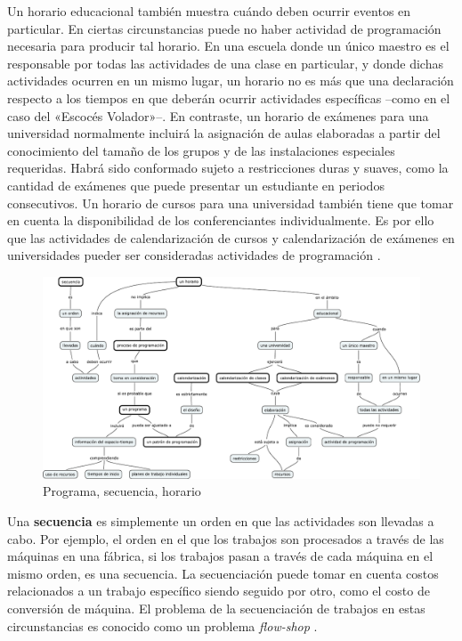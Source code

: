 \documentclass[draft,12pt,headsepline,footsepline,paper=letter]{scrreprt}
\begin{document}
Un horario educacional también muestra cuándo deben ocurrir eventos en particular. En ciertas circunstancias puede no haber actividad de programación necesaria para producir tal horario. En una escuela donde un único maestro es el responsable por todas las actividades de una clase en particular, y donde dichas actividades ocurren en un mismo lugar, un horario no es más que una declaración respecto a los tiempos en que deberán ocurrir actividades específicas –como en el caso del «Escocés Volador»–.
%
En contraste, un horario de exámenes para una universidad normalmente incluirá la asignación de aulas elaboradas a partir del conocimiento del tamaño de los grupos y de las instalaciones especiales requeridas. Habrá sido conformado sujeto a restricciones duras y suaves, como la cantidad de exámenes que puede presentar un estudiante en periodos consecutivos. Un horario de cursos para una universidad también tiene que tomar en cuenta la disponibilidad de los conferenciantes individualmente.
%
Es por ello que las actividades de calendarización de cursos y calendarización de exámenes en universidades pueder ser consideradas actividades de programación \citep[p.~49]{wren95scheduling-timetabling}. 

\begin{figure}
\includegraphics[width=\textwidth]{media/programa_secuencia_horario.pdf}
\caption[Programa, secuencia, horario]{Programa, secuencia, horario}
\label{fig:programa_secuencia_horario}
\end{figure}

Una \textbf{secuencia} es simplemente un orden en que las actividades son llevadas a cabo. Por ejemplo, el orden en el que los trabajos son procesados a través de las máquinas en una fábrica, si los trabajos pasan a través de cada máquina en el mismo orden, es una secuencia. La secuenciación puede tomar en cuenta costos relacionados a un trabajo específico siendo seguido por otro, como el costo de conversión de máquina. El problema de la secuenciación de trabajos en estas circunstancias es conocido como un problema \textit{flow-shop} \citep[p.~49]{wren95scheduling-timetabling}. 
\end{document}
